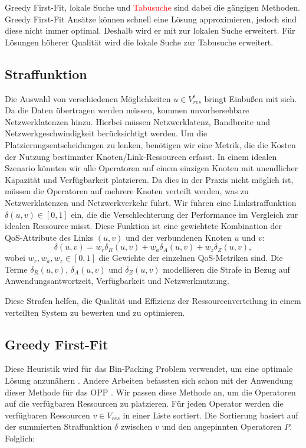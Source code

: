 \documentclass{article}
\begin{document}
Greedy First-Fit, lokale Suche und \textcolor{red}{Tabusuche} sind dabei die gängigen Methoden. 
Greedy First-Fit Ansätze können schnell eine Lösung approximieren, jedoch sind diese nicht immer optimal. Deshalb wird er mit zur lokalen Suche erweitert.
Für Lösungen höherer Qualität wird die lokale Suche zur Tabusuche erweitert.


\subsection{Straffunktion}
Die Auswahl von verschiedenen Möglichkeiten \(u \in V_{res}^i\) bringt Einbußen mit sich. Da die Daten übertragen werden müssen, kommen unvorhersehbare Netzwerklatenzen hinzu. 
Hierbei müssen Netzwerklatenz, Bandbreite und Netzwerkgeschwindigkeit \cite{efficient-operator-placement} berücksichtigt werden.
Um die Platzierungsentscheidungen zu lenken, benötigen wir eine Metrik, die die Kosten der Nutzung bestimmter Knoten/Link-Ressourcen erfasst. 
In einem idealen Szenario könnten wir alle Operatoren auf einem einzigen Knoten mit unendlicher Kapazität und Verfügbarkeit platzieren. 
Da dies in der Praxis nicht möglich ist, müssen die Operatoren auf mehrere Knoten verteilt werden, was zu Netzwerklatenzen und Netzwerkverkehr führt.
Wir führen eine Linkstraffunktion \(\delta(u, v) \in [0, 1]\) ein, die die Verschlechterung der Performance im Vergleich zur idealen Ressource misst. 
Diese Funktion ist eine gewichtete Kombination der QoS-Attribute des Links \((u, v)\) und der verbundenen Knoten \(u\) und \(v\):
\[
\delta(u, v) = w_r \delta_R(u, v) + w_a \delta_A(u, v) + w_z \delta_Z(u, v),
\]
wobei \(w_r, w_a, w_z \in [0, 1]\) die Gewichte der einzelnen QoS-Metriken sind. 
Die Terme \(\delta_R(u, v)\), \(\delta_A(u, v)\) und \(\delta_Z(u, v)\) modellieren die Strafe in Bezug auf Anwendungsantwortzeit, Verfügbarkeit und Netzwerknutzung.

Diese Strafen helfen, die Qualität und Effizienz der Ressourcenverteilung in einem verteilten System zu bewerten und zu optimieren.




\subsection{Greedy First-Fit} \label{greedy-first-fit}
Diese Heuristik wird für das Bin-Packing Problem verwendet, um eine optimale Lösung anzunähern \cite{greedy-first-fit}. 
Andere Arbeiten befassten sich schon  mit der Anwendung dieser Methode für das OPP \cite{k7, k8}.
Wir passen diese Methode an, um die Operatoren auf die verfügbaren Ressourcen zu platzieren. 
Für jeden Operator werden die verfügbaren Ressourcen $v \in V_{res}$ in einer Liste sortiert. Die Sortierung basiert auf der summierten Straffunktion $\delta$
zwischen $v$ und den angepinnten Operatoren $P$. Folglich:
\end{document}
